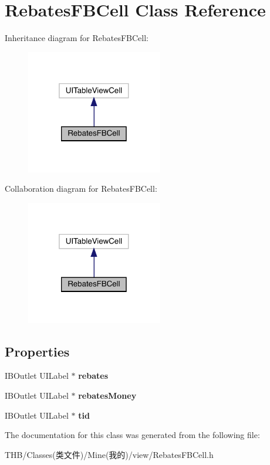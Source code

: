 \hypertarget{interface_rebates_f_b_cell}{}\section{Rebates\+F\+B\+Cell Class Reference}
\label{interface_rebates_f_b_cell}


Inheritance diagram for Rebates\+F\+B\+Cell\+:\nopagebreak
\begin{figure}[H]
\begin{center}
\leavevmode
\includegraphics[width=169pt]{interface_rebates_f_b_cell__inherit__graph}
\end{center}
\end{figure}


Collaboration diagram for Rebates\+F\+B\+Cell\+:\nopagebreak
\begin{figure}[H]
\begin{center}
\leavevmode
\includegraphics[width=169pt]{interface_rebates_f_b_cell__coll__graph}
\end{center}
\end{figure}
\subsection*{Properties}
\begin{DoxyCompactItemize}
\item 
\mbox{\label{interface_rebates_f_b_cell_a8583b4a8cdfb3a43a657cb7c32c6d295}} 
I\+B\+Outlet U\+I\+Label $\ast$ {\bfseries rebates}
\item 
\mbox{\label{interface_rebates_f_b_cell_ac819f129022a721693edd2df0560aa78}} 
I\+B\+Outlet U\+I\+Label $\ast$ {\bfseries rebates\+Money}
\item 
\mbox{\label{interface_rebates_f_b_cell_a2dddf075e4af4cd19a09ec809bbcb403}} 
I\+B\+Outlet U\+I\+Label $\ast$ {\bfseries tid}
\end{DoxyCompactItemize}


The documentation for this class was generated from the following file\+:\begin{DoxyCompactItemize}
\item 
T\+H\+B/\+Classes(类文件)/\+Mine(我的)/view/Rebates\+F\+B\+Cell.\+h\end{DoxyCompactItemize}
